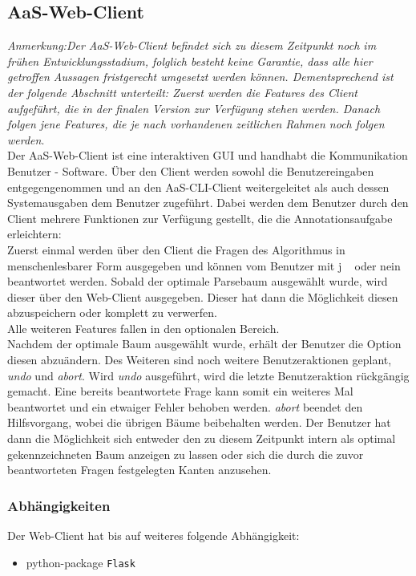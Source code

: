 \documentclass{scrartcl}
\begin{document}
\subsection{AaS-Web-Client}
\label{sub:AaS-Web-Client}
\textit{Anmerkung:Der AaS-Web-Client befindet sich zu diesem Zeitpunkt noch im frühen Entwicklungsstadium, folglich besteht keine Garantie, dass alle hier getroffen Aussagen fristgerecht umgesetzt werden können. Dementsprechend ist der folgende Abschnitt unterteilt: Zuerst werden die Features des Client aufgeführt, die in der finalen Version zur Verfügung stehen werden. Danach folgen jene Features, die je nach vorhandenen zeitlichen Rahmen noch folgen werden}.\\
Der AaS-Web-Client ist eine interaktiven GUI und handhabt die Kommunikation Benutzer - Software. Über den Client werden sowohl die Benutzereingaben entgegengenommen und an den AaS-CLI-Client weitergeleitet als auch dessen Systemausgaben dem Benutzer zugeführt.
Dabei werden dem Benutzer durch den Client mehrere Funktionen zur Verfügung gestellt, die die Annotationsaufgabe erleichtern:\\
Zuerst einmal werden über den Client die Fragen des Algorithmus in menschenlesbarer Form ausgegeben und können vom Benutzer mit \glqq j \grqq~ oder \glqq nein\grqq~ beantwortet werden. Sobald der optimale Parsebaum ausgewählt wurde, wird dieser über den Web-Client ausgegeben. Dieser hat dann die Möglichkeit diesen abzuspeichern oder komplett zu verwerfen.\\
Alle weiteren Features fallen in den optionalen Bereich.\\
Nachdem der optimale Baum ausgewählt wurde, erhält der Benutzer die Option diesen abzuändern.
Des Weiteren sind noch weitere Benutzeraktionen geplant,  \textit{undo} und \textit{abort}. Wird \textit{undo} ausgeführt, wird die letzte Benutzeraktion rückgängig gemacht. Eine bereits beantwortete Frage kann somit ein weiteres Mal beantwortet und ein etwaiger Fehler behoben werden. \textit{abort} beendet den Hilfsvorgang, wobei die übrigen Bäume beibehalten werden. Der Benutzer hat dann die Möglichkeit sich entweder den zu diesem Zeitpunkt intern als optimal gekennzeichneten Baum anzeigen zu lassen oder sich die durch die zuvor beantworteten Fragen festgelegten Kanten anzusehen.

\subsubsection{Abhängigkeiten}
\label{ssub:Web-Client-Abhaengigkeiten}
Der Web-Client hat bis auf weiteres folgende Abhängigkeit:
\begin{itemize}
    \item python-package \texttt{Flask}
\end{itemize}
\end{document}
